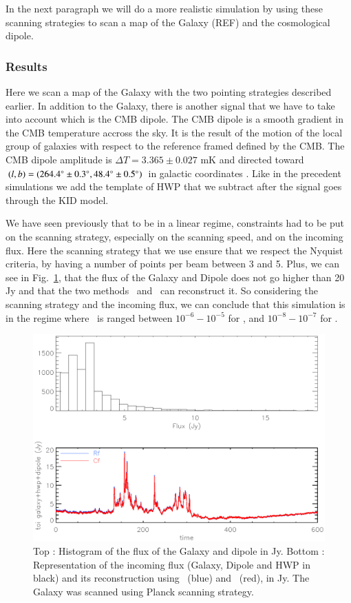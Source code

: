 In the next paragraph we will do a more realistic simulation by using these scanning strategies to scan a map of the Galaxy (REF) and the cosmological dipole.

\subsubsection{Results}

Here we scan a map of the Galaxy with the two pointing strategies described earlier. In addition to the Galaxy, there is another signal that we have to take into account which is the CMB dipole. The CMB dipole is a smooth gradient in the CMB temperature accross the sky. It is the result of the motion of the local group of galaxies with respect to the reference framed defined by the CMB. The CMB dipole amplitude is $\Delta T = 3.365 \pm 0.027$ mK and directed toward $(l,b) = (264.4 \degree \pm 0.3 \degree , 48.4 \degree \pm 0.5 \degree)$ in galactic coordinates \citep{2015IJMPD..2430004B}. Like in the precedent simulations we add the template of HWP that we subtract after the signal goes through the KID model.

We have seen previously that to be in a linear regime, constraints had to be put on the scanning strategy, especially on the scanning speed, and on the incoming flux. Here the scanning strategy that we use ensure that we respect the Nyquist criteria, by having a number of points per beam between 3 and 5. Plus, we can see in Fig.~\ref{fig:histo-gal-dip}, that the flux of the Galaxy and Dipole does not go higher than 20 Jy and that the two methods \rf\ and \cf\ can reconstruct it. So considering the scanning strategy and the incoming flux, we can conclude that this simulation is in the regime where \eps\ is ranged between $10^{-6} - 10^{-5}$ for \rf , and $10^{-8} - 10^{-7}$ for \cf . 

\begin{figure}[h]
\center
	\includegraphics[scale=0.53]{Figures/histo_gal_dip_epic.eps}
	\caption{Top : Histogram of the flux of the Galaxy and dipole in Jy. Bottom : Representation of the incoming flux (Galaxy, Dipole and HWP in black) and its reconstruction using \rf\ (blue) and \cf\ (red), in Jy. The Galaxy was scanned using Planck scanning strategy.}
	\label{fig:histo-gal-dip}
\end{figure}

